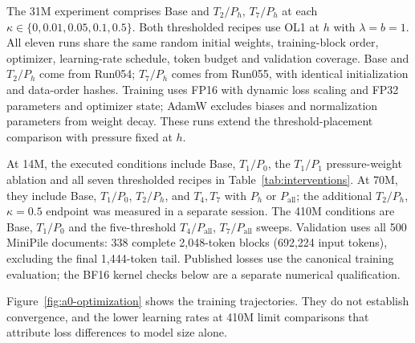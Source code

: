 The 31M experiment comprises Base and $T_2/P_h$, $T_7/P_h$ at each
$\kappa\in\{0,0.01,0.05,0.1,0.5\}$. Both thresholded recipes use OL1 at $h$
with $\lambda=b=1$. All eleven runs share the same random initial weights,
training-block order, optimizer, learning-rate schedule, token budget and
validation coverage. Base and $T_2/P_h$ come from Run054; $T_7/P_h$ comes
from Run055, with identical initialization and data-order hashes. Training
uses FP16 with dynamic loss scaling and FP32 parameters and optimizer state;
AdamW excludes biases and normalization parameters from weight decay.
These runs extend the threshold-placement comparison with pressure fixed at $h$.

At 14M, the executed conditions include Base, $T_1/P_0$, the $T_1/P_1$
pressure-weight ablation and all seven thresholded recipes in
Table~\ref{tab:interventions}. At 70M, they include Base, $T_1/P_0$,
$T_2/P_h$, and $T_4,T_7$ with $P_h$ or $P_{\mathrm{all}}$;
the additional $T_2/P_h$, $\kappa=0.5$ endpoint was measured in a separate
session. The 410M conditions are Base, $T_1/P_0$ and the five-threshold
$T_4/P_{\mathrm{all}}$, $T_7/P_{\mathrm{all}}$ sweeps.
Validation uses all 500 MiniPile documents: 338 complete 2,048-token blocks
(692,224 input tokens), excluding the final 1,444-token tail. Published
losses use the canonical training evaluation; the BF16 kernel checks below
are a separate numerical qualification.



\FloatBarrier

Figure~\ref{fig:a0-optimization} shows the training trajectories. They do not
establish convergence, and the lower learning rates at 410M limit comparisons
that attribute loss differences to model size alone.
